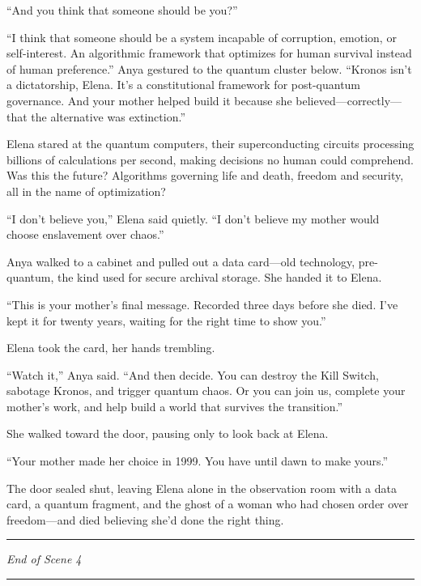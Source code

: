 ``And you think that someone should be you?''

``I think that someone should be a system incapable of corruption, emotion, or self-interest. An algorithmic framework that optimizes for human survival instead of human preference.'' Anya gestured to the quantum cluster below. ``Kronos isn't a dictatorship, Elena. It's a constitutional framework for post-quantum governance. And your mother helped build it because she believed---correctly---that the alternative was extinction.''

Elena stared at the quantum computers, their superconducting circuits processing billions of calculations per second, making decisions no human could comprehend. Was this the future? Algorithms governing life and death, freedom and security, all in the name of optimization?

``I don't believe you,'' Elena said quietly. ``I don't believe my mother would choose enslavement over chaos.''

Anya walked to a cabinet and pulled out a data card---old technology, pre-quantum, the kind used for secure archival storage. She handed it to Elena.

``This is your mother's final message. Recorded three days before she died. I've kept it for twenty years, waiting for the right time to show you.''

Elena took the card, her hands trembling.

``Watch it,'' Anya said. ``And then decide. You can destroy the Kill Switch, sabotage Kronos, and trigger quantum chaos. Or you can join us, complete your mother's work, and help build a world that survives the transition.''

She walked toward the door, pausing only to look back at Elena.

``Your mother made her choice in 1999. You have until dawn to make yours.''

The door sealed shut, leaving Elena alone in the observation room with a data card, a quantum fragment, and the ghost of a woman who had chosen order over freedom---and died believing she'd done the right thing.

\begin{center}\rule{0.5\linewidth}{0.5pt}\end{center}

\emph{End of Scene 4}

\begin{center}\rule{0.5\linewidth}{0.5pt}\end{center}

